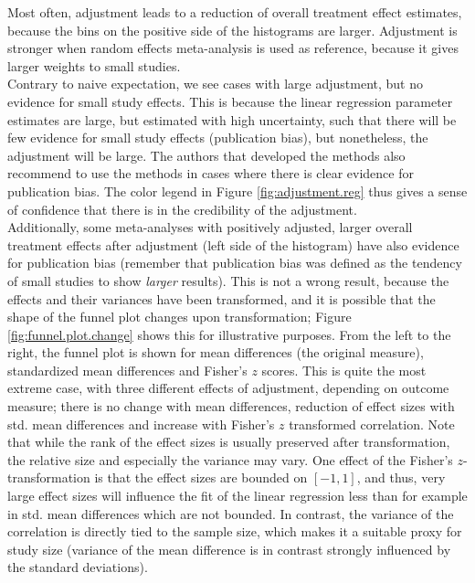 \documentclass[11pt,a4paper,twoside]{book}\usepackage[]{graphicx}\usepackage[]{color}
\begin{document}
Most often, adjustment leads to a reduction of overall treatment effect estimates, because the bins on the positive side of the histograms are larger. Adjustment is stronger when random effects meta-analysis is used as reference, because it gives larger weights to small studies.\\
Contrary to naive expectation, we see cases with large adjustment, but no evidence for small study effects. This is because the linear regression parameter estimates are large, but estimated with high uncertainty, such that there will be few evidence for small study effects (publication bias), but nonetheless, the adjustment will be large. The authors that developed the methods also recommend to use the methods in cases where there is clear evidence for publication bias. The color legend in Figure \ref{fig:adjustment.reg} thus gives a sense of confidence that there is in the credibility of the adjustment. \\
Additionally, some meta-analyses with positively adjusted, larger overall treatment effects after adjustment (left side of the histogram) have also evidence for publication bias (remember that publication bias was defined as the tendency of small studies to show \textit{larger} results). This is not a wrong result, because the effects and their variances have been transformed, and it is possible that the shape of the funnel plot changes upon transformation; Figure \ref{fig:funnel.plot.change} shows this for illustrative purposes. From the left to the right, the funnel plot is shown for mean differences (the original measure), standardized mean differences and Fisher's $z$ scores. This is quite the most extreme case, with three different effects of adjustment, depending on outcome measure; there is no change with mean differences, reduction of effect sizes with std. mean differences and increase with Fisher's $z$ transformed correlation. Note that while the rank of the effect sizes is usually preserved after transformation, the relative size and especially the variance may vary. One effect of the Fisher's $z$-transformation is that the effect sizes are bounded on $[-1,1]$, and thus, very large effect sizes will influence the fit of the linear regression less than for example in std. mean differences which are not bounded. In contrast, the variance of the correlation is directly tied to the sample size, which makes it a suitable proxy for study size (variance of the mean difference is in contrast strongly influenced by the standard deviations).
\end{document}
